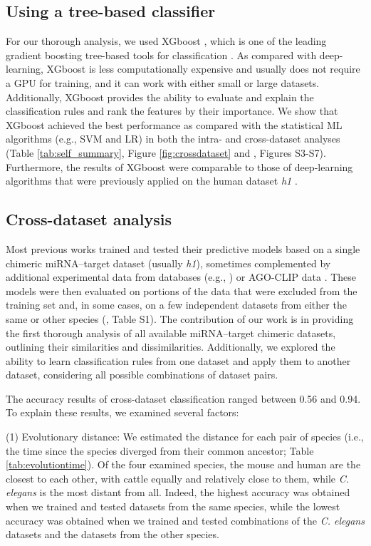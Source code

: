 \documentclass{bmcart}
\begin{document}
\subsection*{Using a tree-based classifier} 
For our thorough analysis, we used XGboost \cite{xgboost}, which is one of the leading gradient boosting tree-based tools for classification \cite{nielsen2016tree}. As compared with deep-learning, XGboost is less computationally expensive and usually does not require a GPU for training, and it can work with either small or large datasets. Additionally, XGboost provides the ability to evaluate and explain the classification rules and rank the features by their importance. 
We show that XGboost achieved the best performance as compared with the statistical ML algorithms (e.g., SVM and LR) in both the intra- and cross-dataset analyses (Table \ref{tab:self_summary}, Figure \ref{fig:crossdataset} and , Figures S3-S7). Furthermore, the results of XGboost were comparable to those of deep-learning algorithms that were previously applied on the human dataset \textit{h1} \cite{wen2018deepmirtar, lee2016deeptarget}.

\subsection*{Cross-dataset analysis}
Most previous works trained and tested their predictive models based on a single chimeric miRNA--target dataset (usually \textit{h1}), sometimes complemented by additional experimental data from databases (e.g., \cite{xiao2009mirecords,chou2016mirtarbase}) or AGO-CLIP data \cite{ding2016tarpmir,wen2018deepmirtar,paker2019mirlstm, lu2016learning, pla2018miraw}. These models were then evaluated on portions of the data that were excluded from the training set and, in some cases, on a few independent datasets from either the same or other species  (, Table S1). 
The contribution of our work is in providing the first thorough analysis of all available miRNA--target chimeric datasets, outlining their similarities and dissimilarities. Additionally, we explored the ability to learn classification rules from one dataset and apply them to another dataset, considering all possible combinations of dataset pairs.

The accuracy results of cross-dataset classification ranged between 0.56 and 0.94. To explain these results, we examined several factors:

(1) Evolutionary distance: We estimated the distance for each pair of species (i.e., the time since the species diverged from their common ancestor; Table \ref{tab:evolutiontime}). Of the four examined species, the mouse and human are the closest to each other, with cattle equally and relatively close to them, while \textit{C. elegans} is the most distant from all. Indeed, the highest accuracy was obtained when we trained and tested datasets from the same species, while the lowest accuracy was obtained when we trained and tested combinations of the \textit{C. elegans} datasets and the datasets from the other species.
\end{document}
